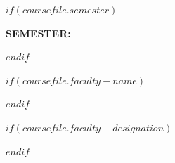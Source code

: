 \begin{titlepage}
\begin{center}
$if(coursefile.semester)$
\vspace{1.5mm}
{\fontsize{13pt}{16pt}\selectfont \parbox{0.92\textwidth}{\centering \textbf{SEMESTER:} \MakeUppercase{\cfSemester}}\par}
$endif$

$if(coursefile.faculty-name)$
\vfill
{\fontsize{12pt}{15pt}\selectfont \parbox{0.92\textwidth}{\centering \textbf{\MakeUppercase{\cfFacultyName}}}\par}
$endif$

$if(coursefile.faculty-designation)$
\vspace{2mm}
{\fontsize{12pt}{15pt}\selectfont \parbox{0.92\textwidth}{\centering \textbf{\MakeUppercase{\cfFacultyDesignation}}}\par}
$endif$
\vfill
\vspace{4mm}
{\fontsize{12pt}{15pt}\selectfont \parbox{0.92\textwidth}{\centering \MakeUppercase{\cfDepartment}}\par}



\end{center}
\end{titlepage}


\frontmatter
\pagestyle{plain}

\mainmatter
\setcounter{chapter}{2}
\pagestyle{fancy}
